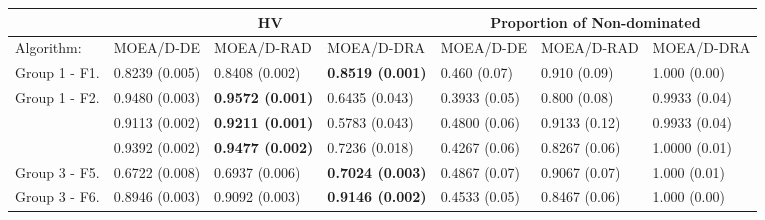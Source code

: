\begin{center}

\begin{table}[!t]
	\tabcolsep=0.33cm
	\footnotesize
	\begin{tabular}{ccccccc}
		\cline{7-7}
		\hline

		\rowcolor[gray]{.5} \multicolumn{1}{|c}{Metric} & \multicolumn{3}{|c|}{HV} &     \multicolumn{3}{c|}{Proportion of Non-dominated} \\ \hline \hline  \hline
		\multicolumn{1}{|l}{Algorithm: }  & \multicolumn{1}{|l|}{MOEA/D-DE} & \multicolumn{1}{l|}{MOEA/D-RAD} & \multicolumn{1}{l|}{MOEA/D-DRA} &  \multicolumn{1}{l|}{MOEA/D-DE} & \multicolumn{1}{l|}{MOEA/D-RAD} & \multicolumn{1}{l|}{MOEA/D-DRA}
		\\ \hline \hline
		\multicolumn{1}{|l|}{Group 1 - F1.}           & \multicolumn{1}{l}{0.8239 (0.005)} & \multicolumn{1}{l}{0.8408 (0.002) } & \multicolumn{1}{l|}{\textbf{0.8519 (0.001)}}
		& \multicolumn{1}{l}{0.460 (0.07)} & \multicolumn{1}{l}{0.910 (0.09) } & \multicolumn{1}{l|}{1.000 (0.00)} \\ \hline
		\multicolumn{1}{|l|}{Group 1 - F2.}              & \multicolumn{1}{l}{0.9480 (0.003)} & \multicolumn{1}{l}{\textbf{0.9572 (0.001)}} & \multicolumn{1}{l|}{0.6435 (0.043)} &		 \multicolumn{1}{l}{0.3933 (0.05)} & \multicolumn{1}{l}{0.800 (0.08) } & \multicolumn{1}{l|}{0.9933 (0.04)} \\ \hline
		 \rowcolor[gray]{.85} \multicolumn{1}{|l|}{Group 2 - F3.}           & \multicolumn{1}{l}{0.9113 (0.002)} & \multicolumn{1}{l}{\textbf{0.9211 (0.001)}} & \multicolumn{1}{l|}{0.5783  (0.043)} & \multicolumn{1}{l}{0.4800 (0.06)} & \multicolumn{1}{l}{0.9133 (0.12)} & \multicolumn{1}{l|}{0.9933 (0.04)}  \\ \hline
		 \rowcolor[gray]{.85} \multicolumn{1}{|l|}{Group 2 - F4.}              & \multicolumn{1}{l}{0.9392 (0.002)} & \multicolumn{1}{l}{\textbf{0.9477 (0.002)}} & \multicolumn{1}{l|}{0.7236 (0.018)}  & \multicolumn{1}{l}{0.4267 (0.06)} & \multicolumn{1}{l}{0.8267 (0.06)} & \multicolumn{1}{l|}{1.0000 (0.01)}  \\ \hline
		\multicolumn{1}{|l|}{Group 3 - F5.}  & \multicolumn{1}{l}{0.6722 (0.008)} & \multicolumn{1}{l}{0.6937 (0.006)} & \multicolumn{1}{l|}{\textbf{0.7024 (0.003)}}  & \multicolumn{1}{l}{0.4867 (0.07)} & \multicolumn{1}{l}{0.9067 (0.07)} & \multicolumn{1}{l|}{1.000 (0.01)}   \\ \hline
		\multicolumn{1}{|l|}{Group 3 - F6.}         & \multicolumn{1}{l}{0.8946 (0.003)} & \multicolumn{1}{l}{0.9092 (0.003)} & \multicolumn{1}{l|}{\textbf{0.9146 (0.002)}}		& \multicolumn{1}{l}{0.4533 (0.05)} & \multicolumn{1}{l}{0.8467 (0.06)} & \multicolumn{1}{l|}{1.000 (0.00)} 		 \\ \hline

\end{tabular}
\end{table}
\end{center}
